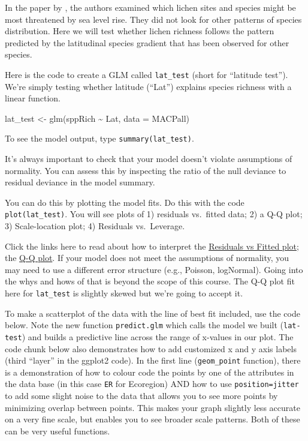\documentclass[
]{book}
\newenvironment{Shaded}{\begin{snugshade}}{\end{snugshade}}
\newcommand{\AttributeTok}[1]{\textcolor[rgb]{0.77,0.63,0.00}{#1}}
\newcommand{\FunctionTok}[1]{\textcolor[rgb]{0.00,0.00,0.00}{#1}}
\newcommand{\NormalTok}[1]{#1}
\newcommand{\OtherTok}[1]{\textcolor[rgb]{0.56,0.35,0.01}{#1}}
\newcommand{\SpecialCharTok}[1]{\textcolor[rgb]{0.00,0.00,0.00}{#1}}
\begin{document}
In the paper by \citet{McMullin2019}, the authors examined which lichen sites and species might be most threatened by sea level rise. They did not look for other patterns of species distribution. Here we will test whether lichen richness follows the pattern predicted by the latitudinal species gradient that has been observed for other species.

Here is the code to create a GLM called \texttt{lat\_test} (short for ``latitude test''). We're simply testing whether latitude (``Lat'') explains species richness with a linear function.

\begin{Shaded}
\begin{Highlighting}[]
\NormalTok{lat\_test }\OtherTok{\textless{}{-}} \FunctionTok{glm}\NormalTok{(sppRich }\SpecialCharTok{\textasciitilde{}}\NormalTok{ Lat, }\AttributeTok{data =}\NormalTok{ MACPall)}
\end{Highlighting}
\end{Shaded}

To see the model output, type \texttt{summary(lat\_test)}.

It's always important to check that your model doesn't violate assumptions of normality. You can assess this by inspecting the ratio of the null deviance to residual deviance in the model summary.

You can do this by plotting the model fits. Do this with the code \texttt{plot(lat\_test)}. You will see plots of 1) residuals vs.~fitted data; 2) a Q-Q plot; 3) Scale-location plot; 4) Residuals vs.~Leverage.

Click the links here to read about how to interpret the \href{https://stats.stackexchange.com/questions/76226/interpreting-the-residuals-vs-fitted-values-plot-for-verifying-the-assumptions}{Residuals vs Fitted plot}; the \href{https://stats.stackexchange.com/questions/101274/how-to-interpret-a-qq-plot}{Q-Q plot}. If your model does not meet the assumptions of normality, you may need to use a different error structure (e.g., Poisson, logNormal). Going into the whys and hows of that is beyond the scope of this course. The Q-Q plot fit here for \texttt{lat\_test} is slightly skewed but we're going to accept it.

To make a scatterplot of the data with the line of best fit included, use the code below. Note the new function \texttt{predict.glm} which calls the model we built (\texttt{lat-test}) and builds a predictive line across the range of x-values in our plot. The code chunk below also demonstrates how to add customized x and y axis labels (third ``layer'' in the ggplot2 code). In the first line (\texttt{geom\_point} function), there is a demonstration of how to colour code the points by one of the attributes in the data base (in this case \texttt{ER} for Ecoregion) AND how to use \texttt{position=jitter} to add some slight noise to the data that allows you to see more points by minimizing overlap between points. This makes your graph slightly less accurate on a very fine scale, but enables you to see broader scale patterns. Both of these can be very useful functions.
\end{document}
